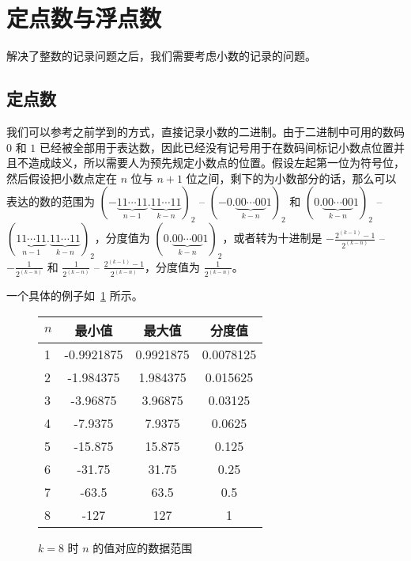 \section{定点数与浮点数}\label{sec:NumberSystemBasics/fixed-point-and-floating-point}
    解决了整数的记录问题之后，我们需要考虑小数的记录的问题。

    \subsection{定点数}\label{subsec:NumberSystemBasics/fixed-point-and-floating-point/fixed-point}

        我们可以参考之前学到的方式，直接记录小数的二进制。由于二进制中可用的数码 $0$ 和 $1$ 已经被全部用于表达数，因此已经没有记号用于在数码间标记小数点位置并且不造成歧义，所以需要人为预先规定小数点的位置。假设左起第一位为符号位，然后假设把小数点定在 $n$ 位与 $n + 1$ 位之间，剩下的为小数部分的话，那么可以表达的数的范围为 $(-\underbrace{11 \cdots 11}_{n-1}.\underbrace{11 \cdots 11}_{k-n})_2$ -- $(-0.\underbrace{00 \cdots 00}_{k-n}1)_2$ 和 $(0.\underbrace{00 \cdots 00}_{k-n}1)_2$ -- $(\underbrace{11 \cdots 11}_{n-1}.\underbrace{11 \cdots 11}_{k-n})_2$，分度值为 $(0.\underbrace{00 \cdots 00}_{k-n}1)_2$，或者转为十进制是 $-\frac{2^{(k-1)}-1}{2^{(k-n)}}$ -- $-\frac{1}{2^{(k-n)}}$ 和 $\frac{1}{2^{(k-n)}}$ -- $\frac{2^{(k-1)}-1}{2^{(k-n)}}$，分度值为 $\frac{1}{2^{(k-n)}}$。

        一个具体的例子如~\ref{fig:NumberSystemBasics/fixed-point-and-floating-point/fixed-point/data-range} 所示。

        \begin{figure}
            \centering
            \begin{tabular}{lS[table-format=-3.7]S[table-format=-3.7]S[table-format=-3.7]}
                $n$ & 最小值     & 最大值    & 分度值    \\    & -0.9921875 & 0.9921875  & 0.0078125 \\
                2   & -1.984375  & 1.984375   & 0.015625  \\
                3   & -3.96875   & 3.96875    & 0.03125   \\
                4   & -7.9375    & 7.9375     & 0.0625    \\
                5   & -15.875    & 15.875     & 0.125     \\
                6   & -31.75     & 31.75      & 0.25      \\
                7   & -63.5      & 63.5       & 0.5       \\
                8   & -127       & 127        & 1         \\
            \end{tabular}
            \caption{$k = 8$ 时 $n$ 的值对应的数据范围}
            \label{fig:NumberSystemBasics/fixed-point-and-floating-point/fixed-point/data-range}
        \end{figure}

